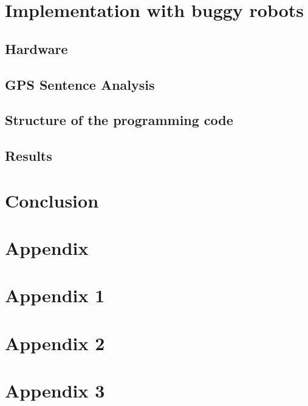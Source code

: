 \documentclass[12pt,fleqn]{report} %
\begin{document}
\chapter{Implementation with buggy robots}
\section{Hardware}

\section{GPS Sentence Analysis}

\section{Structure of the programming code}

\section{Results}


\chapter*{Conclusion}


\appendix
\chapter*{Appendix}
\chapter{Appendix 1}
\chapter{Appendix 2}
\chapter{Appendix 3}

%


\nocite{*}

\end{document}
